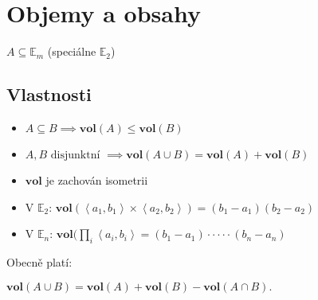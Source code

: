 \documentclass[../main.tex]{subfiles}
\begin{document}
\section{Objemy a obsahy}
\hspace{1.2mm}
$A \subseteq \mathbb{E}_m$ (speciálne $\mathbb{E}_2$)
\noindent

\subsection{Vlastnosti}
\hspace{1.2mm}
\begin{itemize}
    \item $A \subseteq B \implies \mathbf{vol}(A) \leq \mathbf{vol}(B)$
    \item $A, B \text{ disjunktní } \implies \mathbf{vol}(A \cup B) = \mathbf{vol}(A) + \mathbf{vol}(B)$
    \item $\mathbf{vol}$ je zachován isometrii
    \item V $\mathbb{E}_2$: $\mathbf{vol}(\left<a_1,b_1\right>\times \left<a_2,b_2\right>) = (b_1 - a_1)(b_2 - a_2)$
    \item V $\mathbb{E}_n$: $\mathbf{vol}(\prod_i \left<a_i,b_i\right> = (b_1 - a_1) \cdot \cdot \cdot \cdot \cdot (b_n-a_n)$
\end{itemize}

Obecně platí:

$\mathbf{vol}(A \cup B) = \mathbf{vol}(A)+\mathbf{vol}(B)-\mathbf{vol}(A \cap B).$
\end{document}
